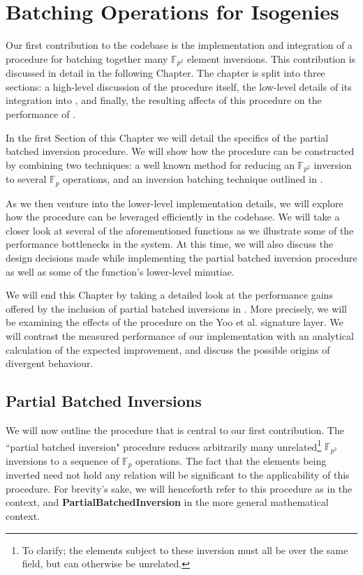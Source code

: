 \chapter{Batching Operations for Isogenies}
\label{sec:batching}

Our first contribution to the \sidh codebase is the implementation and integration of a procedure for batching together many $\mathbb{F}_{p^2}$ element inversions. This contribution is discussed in detail in the following Chapter. The chapter is split into three sections: a high-level discussion of the procedure itself, the low-level details of its integration into \sidh, and finally, the resulting affects of this procedure on the performance of \sidh.

In the first Section of this Chapter we will detail the specifics of the partial batched inversion procedure. We will show how the procedure can be constructed by combining two techniques: a well known method for reducing an $\mathbb{F}_{p^2}$ inversion to several $\mathbb{F}_{p}$ operations, and an inversion batching technique outlined in \cite{batching}.

As we then venture into the lower-level implementation details, we will explore how the procedure can be leveraged efficiently in the codebase. We will take a closer look at several of the aforementioned \sidh functions as we illustrate some of the performance bottlenecks in the system. At this time, we will also discuss the design decisions made while implementing the partial batched inversion procedure as well as some of the function's lower-level minutiae.

We will end this Chapter by taking a detailed look at the performance gains offered by the inclusion of partial batched inversions in \sidh. More precisely, we will be examining the effects of the procedure on the Yoo et al. signature layer. We will contrast the measured performance of our implementation with an analytical calculation of the expected improvement, and discuss the possible origins of divergent behaviour.\\

\section{Partial Batched Inversions}
\label{sec:pbi}

We will now outline the procedure that is central to our first contribution. The ``partial batched inversion" procedure reduces arbitrarily many unrelated\footnote{To clarify; the elements subject to these inversion must all be over the same field, but can otherwise be unrelated.} $\mathbb{F}_{p^{2}}$ inversions to a sequence of $\mathbb{F}_{p}$ operations. The fact that the elements being inverted need not hold any relation will be significant to the applicability of this procedure. For brevity's sake, we will henceforth refer to this procedure as  in the \sidh context, and \textbf{PartialBatchedInversion} in the more general mathematical context.


